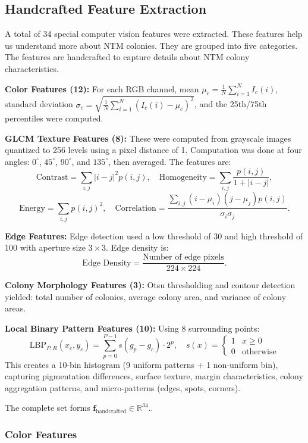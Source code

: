 \documentclass[journal,article,submit,pdftex,moreauthors]{Definitions/mdpi}
\begin{document}
\subsection{\textbf{Handcrafted Feature Extraction }}

A total of 34 special computer vision features were extracted. These features help us understand more about NTM colonies. They are grouped into five categories. The features are handcrafted to capture details about NTM colony characteristics.

\textbf{Color Features (12):} For each RGB channel, mean \( \mu_c = \frac{1}{N} \sum_{i=1}^N I_c(i) \), standard deviation \( \sigma_c = \sqrt{\frac{1}{N} \sum_{i=1}^N (I_c(i) - \mu_c)^2} \), and the 25th/75th percentiles were computed.

\textbf{GLCM Texture Features (8):} These were computed from grayscale images quantized to 256 levels using a pixel distance of 1. Computation was done at four angles: $0^\circ$, $45^\circ$, $90^\circ$, and $135^\circ$, then averaged. The features are:
\[
\text{Contrast} = \sum_{i,j} |i - j|^2 p(i,j), \quad
\text{Homogeneity} = \sum_{i,j} \frac{p(i,j)}{1 + |i - j|},
\]
\[
\text{Energy} = \sum_{i,j} p(i,j)^2, \quad
\text{Correlation} = \frac{\sum_{i,j} (i - \mu_i)(j - \mu_j) p(i,j)}{\sigma_i \sigma_j}.
\]

\textbf{Edge Features:} Edge detection used a low threshold of 30 and high threshold of 100 with aperture size $3 \times 3$. Edge density is:
\[
\text{Edge Density} = \frac{\text{Number of edge pixels}}{224 \times 224}.
\]

\textbf{Colony Morphology Features (3):} Otsu thresholding and contour detection yielded: total number of colonies, average colony area, and variance of colony areas.

\textbf{Local Binary Pattern Features (10):} Using 8 surrounding points:
\[
\text{LBP}_{P,R}(x_c, y_c) = \sum_{p=0}^{P-1} s(g_p - g_c) \cdot 2^p, \quad
s(x) = 
\begin{cases} 
	1 & x \geq 0 \\
	0 & \text{otherwise}
\end{cases}
\]
This creates a 10-bin histogram (9 uniform patterns + 1 non-uniform bin), capturing pigmentation differences, surface texture, margin characteristics, colony aggregation patterns, and micro-patterns (edges, spots, corners).

The complete set forms \( \mathbf{f}_{\text{handcrafted}} \in \mathbb{R}^{34} \)..

\subsubsection{\textbf{Color Features}}
\end{document}
